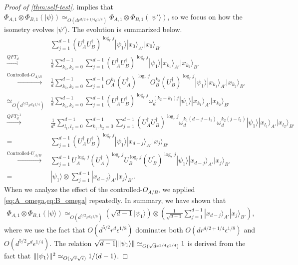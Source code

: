\documentclass[11pt,letterpaper]{article}
\newcommand{\ket}[1]{|#1\rangle}
\newcommand{\x}{\otimes}
\newcommand{\ct}{^{\dagger}}
\DeclarePairedDelimiter{\norm}{\lVert}{\rVert}
\newcommand{\1}{\mathbb{1}}
\newcommand{\ep}{\epsilon}
\newcommand{\se}{\sqrt{\epsilon}}
\newcommand{\qe}{\epsilon^{1/4}}
\newcommand{\sd}{\sqrt{d}}
\newcommand{\sr}{\sqrt{r}}
\newcommand{\qr}{r^{1/4}}
\newcommand{\appd}[1]{\simeq_{#1}}
\theoremstyle{definition}
\begin{document}
\begin{proof}[Proof of \cref{thm:self-test}]
 implies that $ \Phi_{A,1} \x \Phi_{B,1} (\ket{\psi}) \appd{O(d r^{d/2 +1/4} \ep^{1/8})}  \Phi_{A,1} \x \Phi_{B,1} (\ket{\psi'})$,  
so we focus on how the isometry evolves $\ket{\psi'}$.
The evolution is summarized below.
	\begin{align*}
		& \sum_{j=1}^{d-1} (U_A\ct U_B\ct)^{\log_r j} \ket{\psi_1} \ket{x_0}_{A'}\ket{x_0}_{B'}\\
		\xrightarrow[]{QFT_d}& \frac{1}{d}\sum_{k_1,k_2 = 0}^{d-1} \sum_{j=1}^{d-1} (U_A\ct U_B\ct)^{\log_r j}  \ket{\psi_1}\ket{x_{k_1}}_{A'}\ket{x_{k_2}}_{B'}\\
		\xrightarrow[]{\text{Controlled-}O_{A/B}}& \frac{1}{d}\sum_{k_1,k_2 = 0}^{d-1} \sum_{j=1}^{d-1} O_A^{k_1}(U_A\ct)^{\log_r j} O_B^{k_2}(U_B\ct)^{\log_r j}
		\ket{\psi_1} \ket{x_{k_1}}_{A'}\ket{x_{k_2}}_{B'}\\
		\appd{O(d^{5/2} r^{d} \qe)}&\frac{1}{d} \sum_{k_1,k_2 = 0}^{d-1} \sum_{j=1}^{d-1} (U_A\ct U_B\ct)^{\log_r j}\omega_d^{(k_2-k_1)j}\ket{\psi_1} \ket{x_{k_1}}_{A'}\ket{x_{k_2}}_{B'}\\
		\xrightarrow[]{QFT_d^{-1}} &\frac{1}{d^2}\sum_{l_1,l_2 = 0}^{d-1}\sum_{k_1,k_2 = 0}^{d-1}\sum_{j=1}^{d-1} (U_A\ct U_B\ct)^{\log_r j} 
		\omega_d^{k_1(d-j-l_1)}\omega_d^{k_2(j-l_2)}\ket{\psi_1} \ket{x_{l_1}}_{A'}\ket{x_{l_2}}_{B'}\\
		= &\sum_{j=1}^{d-1}(U_A\ct U_B\ct)^{\log_r j} \ket{\psi_1} \ket{x_{d-j}}_{A'}\ket{x_j}_{B'} \\
		\xrightarrow[]{\text{Controlled-}U_{A/B}}& \sum_{j=1}^{d-1} U_A^{\log_r j} (U_A\ct)^{\log_r j} U_B^{\log_r j} (U_B\ct)^{\log_r j} \ket{\psi_1} \ket{x_{d-j}}_{A'}\ket{x_j}_{B'}\\
		=&\ket{\psi_1} \x \sum_{j=1}^{d-1} \ket{x_{d-j}}_{A'}\ket{x_j}_{B'}.
	\end{align*}
When we analyze the effect of the controlled-$O_{A/B}$, we applied \cref{eq:A_omega,eq:B_omega} repeatedly.
In summary, we have shown that
\begin{align}
	\Phi_{A,1}\x\Phi_{B,1}(\ket{\psi}) \appd{O(d^{5/2} r^{d} \ep^{1/8})} \left(\sqrt{d-1} \ket{\psi_1}\right) \x \left(\frac{1}{\sqrt{d-1}}\sum_{j=1}^{d-1} \ket{x_{d-j}}_{A'}\ket{x_j}_{B'}\right),
\end{align}
where we use the fact that $O(d^{5/2} r^{d} \ep^{1/8})$ dominates both $O(d r^{d/2+1/4} \ep^{1/8})$ and 
$O(d^{5/2} r^{d} \qe)$.
The relation $ \sqrt{d-1} \norm{\ket{\psi_1}} \appd{O(\sd \qr\qe)} 1$ is derived from the fact that
$\norm{\ket{\psi_1}}^2 \appd{O(\sr \se)} 1/(d-1)$.


\end{proof}
\end{document}
